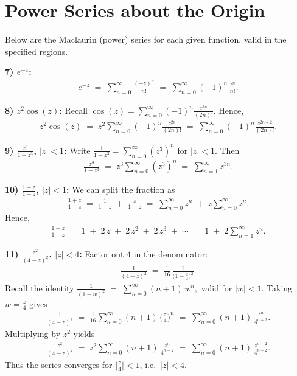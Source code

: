 \documentclass[12pt]{article}
\theoremstyle{definition} %
\theoremstyle{plain} %
\begin{document}
\section*{Power Series about the Origin}

Below are the Maclaurin (power) series for each given function, valid in the specified regions.

\medskip
\noindent
\textbf{7) $e^{-z}$:}
\begin{align}
e^{-z}
\;=\;
\sum_{n=0}^\infty \frac{(-z)^n}{n!}
\;=\;
\sum_{n=0}^\infty (-1)^n \,\frac{z^n}{n!}.
\end{align}

\medskip
\noindent
\textbf{8) $z^2 \cos(z)$:}
Recall 
\(\displaystyle
\cos(z)
=\sum_{n=0}^\infty (-1)^n \frac{z^{2n}}{(2n)!}.
\)
Hence,
\begin{align}
z^2 \cos(z)
\;=\;
z^2
\sum_{n=0}^\infty 
(-1)^n 
\frac{z^{2n}}{(2n)!}
\;=\;
\sum_{n=0}^\infty
(-1)^n
\frac{z^{2n+2}}{(2n)!}.
\end{align}

\medskip
\noindent
\textbf{9) $\displaystyle \frac{z^3}{1 - z^3}$, \quad $|z|<1$:}
Write
\(\tfrac{1}{1 - z^3}=\sum_{n=0}^\infty (z^3)^n\)
for \(|z|<1\).  Then
\begin{align}
\frac{z^3}{1 - z^3}
\;=\;
z^3 \sum_{n=0}^\infty (z^3)^n 
\;=\;
\sum_{n=1}^\infty z^{3n}.
\end{align}

\medskip
\noindent
\textbf{10) $\displaystyle \frac{1 + z}{1 - z}$, \quad $|z|<1$:}
We can split the fraction as 
\begin{align}
\frac{1+z}{1-z}
\;=\;
\frac{1}{1-z} \;+\; \frac{z}{1-z}
\;=\;
\sum_{n=0}^\infty z^n
\;+\;
z \sum_{n=0}^\infty z^n.
\end{align}
Hence,
\begin{align}
\frac{1 + z}{1 - z}
\;=\;
1
\;+\;
2\,z
\;+\;
2\,z^2
\;+\;
2\,z^3
\;+\;\cdots
\;=\;
1 \;+\; 2\sum_{n=1}^\infty z^n.
\end{align}

\medskip
\noindent
\textbf{11) $\displaystyle \frac{z^2}{(4-z)^2}$, \quad $|z|<4$:}
Factor out $4$ in the denominator:
\begin{align}
\frac{1}{(4-z)^2}
\;=\;
\frac{1}{16}\,\frac{1}{\bigl(1 - \tfrac{z}{4}\bigr)^2}.
\end{align}
Recall the identity
\(\displaystyle
\frac{1}{(1-w)^2}
\;=\;
\sum_{n=0}^\infty (n+1)\,w^n,
\)
valid for \(|w| < 1\).  Taking $w = \frac{z}{4}$ gives
\begin{align}
\frac{1}{(4 - z)^2}
\;=\;
\frac{1}{16}
\sum_{n=0}^\infty (n+1)\,\bigl(\tfrac{z}{4}\bigr)^n
\;=\;
\sum_{n=0}^\infty 
(n+1)\,\frac{z^n}{4^{n+2}}.
\end{align}
Multiplying by $z^2$ yields
\begin{align}
\frac{z^2}{(4 - z)^2}
\;=\;
z^2
\sum_{n=0}^\infty 
(n+1)\,\frac{z^n}{4^{n+2}}
\;=\;
\sum_{n=0}^\infty 
(n+1)\,\frac{z^{n+2}}{4^{n+2}}.
\end{align}
Thus the series converges for $\bigl|\tfrac{z}{4}\bigr|<1$, i.e.\ $|z|<4$.
\end{document}
